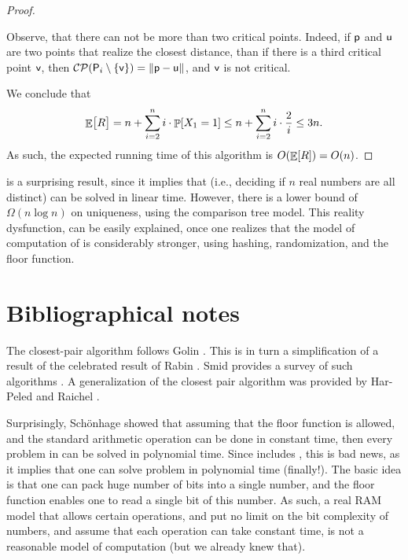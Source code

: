 \begin{proof}
\begin{compactenumA}
    \end{compactenumA}
    \smallskip%
    Observe, that there can not be more than two critical points.
    Indeed, if $\mathsf{p}$ and $\mathsf{u}$ are two points that realize the
    closest distance, than if there is a third critical point $\mathsf{v}$,
    then
    $\mathcal{CP}( {\mathsf{P}}_i \setminus \left\{ {\mathsf{v}} \right\}) = \left\| {\mathsf{p} - 
       \mathsf{u}} \right\|$, and $\mathsf{v}$ is not critical.

    We conclude that 
    \[
    \Ex{\bigl. R} = n + \sum_{i=2}^n i \cdot \Prob{X_1 = 1} \leq
    n + \sum_{i=2}^n i \cdot \frac{2}{i} \leq 3n. 
    \]
    As such, the expected running time of this algorithm is $O\pth{
    \Ex{R\MakeBig}} = O(n)$.
\end{proof}


 is a surprising result, since it implies that
 (i.e., deciding if $n$ real numbers are all
distinct) can be solved in linear time. However, there is a lower
bound of $\Omega(n \log n)$ on uniqueness, using the comparison tree
model. This reality dysfunction, can be easily explained, once one
realizes that the model of computation of  is
considerably stronger, using hashing, randomization, and the floor
function.



\section{Bibliographical notes}

The closest-pair algorithm follows Golin \etal{} \cite{grss-sracp-95}.
This is in turn a simplification of a result of the celebrated result
of Rabin \cite{r-pa-76}.  Smid provides a survey of such algorithms
\cite{s-cppcg-00}. A generalization of the closest pair algorithm was
provided by Har-Peled and Raichel \cite{hr-nplta-15}.

Surprisingly, Sch{\"{o}}\si{nhage} \cite{s-pram-79} showed that
assuming that the floor function is allowed, and the standard
arithmetic operation can be done in constant time, then every problem
in \PSPACE can be solved in polynomial time. Since \PSPACE includes
\NPC, this is bad news, as it implies that one can solve \NPC problem
in polynomial time (finally!). The basic idea is that one can pack
huge number of bits into a single number, and the floor function
enables one to read a single bit of this number. As such, a real RAM
model that allows certain operations, and put no limit on the bit
complexity of numbers, and assume that each operation can take
constant time, is not a reasonable model of computation (but we
already knew that).


\ChapterEnd{}
%  
%

%
